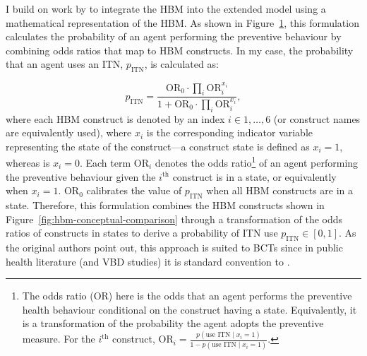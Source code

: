 \begin{figure}[hbt!]
     \centering
     \begin{adjustbox}{center}
         \resizebox{1\textwidth}{!}{
            
         }
     \end{adjustbox}
    \label{fig:hbm-implementation}
\end{figure}

I build on work by \citet{durham_incorporating_2012} to integrate the HBM into the extended model using a mathematical representation of the HBM. As shown in Figure~\ref{fig:hbm-implementation}, this formulation calculates the probability of an agent performing the preventive behaviour by combining odds ratios that map to HBM constructs. In my case, the probability that an agent uses an ITN, $p_{\text{ITN}}$, is calculated as:

\begin{equation}\label{eq:prob-hbm}
    p_{\text{ITN}} = \frac{\text{OR}_0\cdot\prod_i{\text{OR}_i^{x_i}}}{1+\text{OR}_0\cdot\prod_i{\text{OR}_i^{x_i}}},
\end{equation}
where each HBM construct is denoted by an index $i\in1,\dots,6$ (or construct names are equivalently used), where $x_i$ is the corresponding indicator variable representing the state of the construct---a  construct state is defined as $x_i=1$, whereas  is $x_i=0$. Each term $\text{OR}_{i}$ denotes the odds ratio\footnote{The odds ratio (OR) here is the odds that an agent performs the preventive health behaviour conditional on the construct having a  state. Equivalently, it is a transformation of the probability the agent adopts the preventive measure. For the $i^{\text{th}}$ construct, $\text{OR}_i=\frac{p({\text{use ITN}}\mid x_i=1)}{1-p({\text{use ITN}}\mid x_i=1)}$.} of an agent performing the preventive behaviour given the $i^{\text{th}}$ construct is in a  state, or equivalently when $x_i=1$. $\text{OR}_0$ calibrates the value of $p_{\text{ITN}}$ when all HBM constructs are in a  state. Therefore, this formulation combines the HBM constructs shown in Figure~\ref{fig:hbm-conceptual-comparison} through a transformation of the odds ratios of constructs in  states to derive a probability of ITN use $p_{\text{ITN}}\in[0,1]$. As the original authors point out, this approach is suited to BCTs since in public health literature (and VBD studies) it is standard convention to  \cite{durham_incorporating_2012}.

